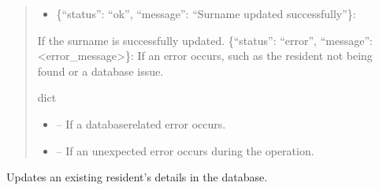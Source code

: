\documentclass[letterpaper,10pt,english]{sphinxmanual}
\begin{document}
\begin{fulllineitems}
\begin{fulllineitems}
\begin{quote}
\begin{description}
\begin{itemize}
\end{itemize}

\sphinxAtStartPar
\begin{description}
\begin{itemize}
\item {} 
\sphinxAtStartPar
\{“status”: “ok”, “message”: “Surname updated successfully”\}:

\end{itemize}

\sphinxAtStartPar
If the surname is successfully updated.
\sphinxhyphen{} \{“status”: “error”, “message”: <error\_message>\}:
If an error occurs, such as the resident not being found or a database issue.

\end{description}


\sphinxAtStartPar
dict

\begin{itemize}
\item {} 
\sphinxAtStartPar
{} – If a database\sphinxhyphen{}related error occurs.

\item {} 
\sphinxAtStartPar
{} – If an unexpected error occurs during the operation.

\end{itemize}

\end{description}\end{quote}

\end{fulllineitems}


\begin{fulllineitems}
\label{\detokenize{app.controllers:app.controllers.resident_controller.ResidentController.update_resident}}
\pysigstartsignatures
\pysiglinewithargsret
{}
{\sphinxparamcomma {}\sphinxparamcomma {}}
{}
\pysigstopsignatures
\sphinxAtStartPar
Updates an existing resident’s details in the database.


\end{fulllineitems}
\end{fulllineitems}
\end{document}
